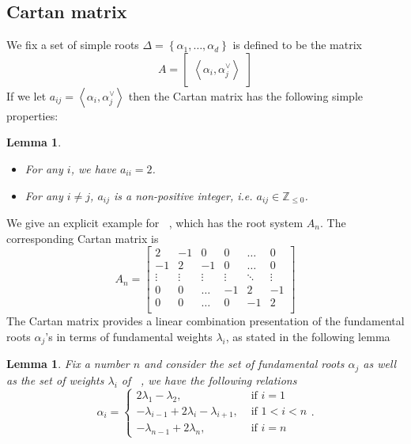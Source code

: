 \documentclass[12pt]{article} %
\newtheorem{lemma}[definition]{Lemma}
\DeclareMathOperator{\SLn}{\text{SL}_n(\mathbb{R})}
\DeclareMathOperator{\slnr}{\mathfrak{sl}_n(\mathbb{R})}
\begin{document}
\subsection{Cartan matrix}
We fix a set of simple roots $\Delta = \left\lbrace \alpha_1,\ldots,\alpha_d \right\rbrace$ is defined to be the matrix
\[A = \begin{bmatrix} \left\langle \alpha_i,\alpha_j^\vee  \right\rangle
    \end{bmatrix}\]
If we let $a_{ij}=  \left\langle \alpha_i,\alpha_j^\vee\right\rangle$ then the Cartan matrix has the following simple properties:
\begin{lemma}
    \hfill
    \begin{itemize}
        \item For any $i$, we have $a_{ii}=2$.
        \item For any $i \ne j$, $a_{ij}$ is a non-positive integer, i.e. $a_{ij} \in \mathbb{Z}_{\le 0}$.
    \end{itemize}
\end{lemma}
We give an explicit example for $\slnr$, which has the root system $A_n$. The corresponding Cartan matrix is
\[A_n = \begin{bmatrix}
        2      & -1     & 0      & 0      & \ldots & 0      \\
        -1     & 2      & -1     & 0      & \ldots & 0      \\
        \vdots & \vdots & \vdots & \vdots & \ddots & \vdots \\
        0      & 0      & \ldots & -1     & 2      & -1     \\
        0      & 0      & \ldots & 0      & -1     & 2      \\
    \end{bmatrix}\]
The Cartan matrix provides a linear combination presentation of the fundamental roots $\alpha_j$'s in terms of fundamental weights $\lambda_i$,
as stated in the following lemma
\begin{lemma}\label{weight-root-comb}
    Fix a number $n$ and consider the set of fundamental roots $\alpha_j$ as well as the set of weights $\lambda_i$ of $\SLn$, we have the following relations
    \[\alpha_i = \begin{cases}
            2\lambda_1-\lambda_2,                    & \mbox{ if } i = 1 \\
            -\lambda_{i-1}+2\lambda_i-\lambda_{i+1}, & \mbox{ if } 1<i<n \\
            -\lambda_{n-1}+2\lambda_n,               & \mbox{ if } i =n
        \end{cases}.\]
\end{lemma}
\end{document}
